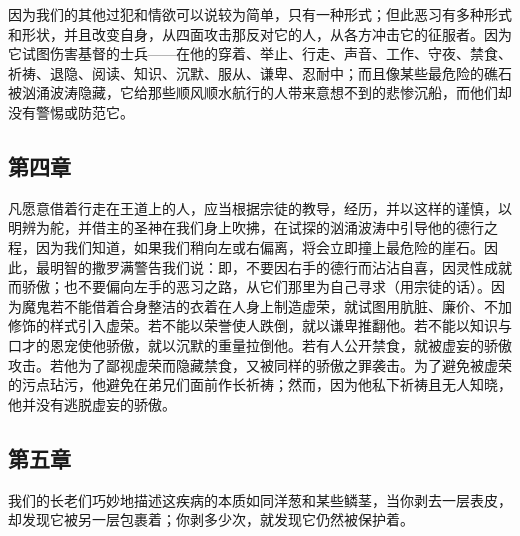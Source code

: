 \par

因为我们的其他过犯和情欲可以说较为简单，只有一种形式；但此恶习有多种形式和形状，并且改变自身，从四面攻击那反对它的人，从各方冲击它的征服者。因为它试图伤害基督的士兵——在他的穿着、举止、行走、声音、工作、守夜、禁食、祈祷、退隐、阅读、知识、沉默、服从、谦卑、忍耐中；而且像某些最危险的礁石被汹涌波涛隐藏，它给那些顺风顺水航行的人带来意想不到的悲惨沉船，而他们却没有警惕或防范它。\par


\subsection{第四章}

\par

凡愿意借着行走在王道上的人，应当根据宗徒的教导，经历，并以这样的谨慎，以明辨为舵，并借主的圣神在我们身上吹拂，在试探的汹涌波涛中引导他的德行之程，因为我们知道，如果我们稍向左或右偏离，将会立即撞上最危险的崖石。因此，最明智的撒罗满警告我们说：即，不要因右手的德行而沾沾自喜，因灵性成就而骄傲；也不要偏向左手的恶习之路，从它们那里为自己寻求（用宗徒的话）。因为魔鬼若不能借着合身整洁的衣着在人身上制造虚荣，就试图用肮脏、廉价、不加修饰的样式引入虚荣。若不能以荣誉使人跌倒，就以谦卑推翻他。若不能以知识与口才的恩宠使他骄傲，就以沉默的重量拉倒他。若有人公开禁食，就被虚妄的骄傲攻击。若他为了鄙视虚荣而隐藏禁食，又被同样的骄傲之罪袭击。为了避免被虚荣的污点玷污，他避免在弟兄们面前作长祈祷；然而，因为他私下祈祷且无人知晓，他并没有逃脱虚妄的骄傲。\par


\subsection{第五章}

\par

我们的长老们巧妙地描述这疾病的本质如同洋葱和某些鳞茎，当你剥去一层表皮，却发现它被另一层包裹着；你剥多少次，就发现它仍然被保护着。\par

